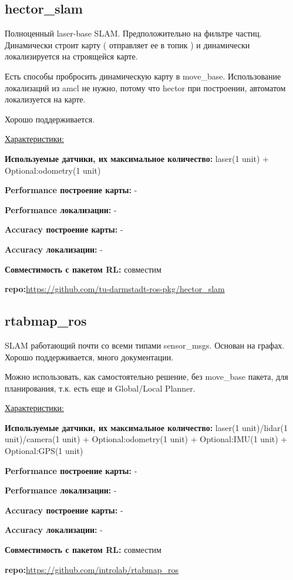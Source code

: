 \documentclass[a4paper, 14pt]{extreport}
\begin{document}
\subsection{hector\_slam}
\par Полноценный laser-base SLAM. Предположительно на фильтре частиц. Динамически строит карту ( отправляет ее в топик ) и динамически локализируется на строящейся карте.
\par\noindent Есть способы пробросить динамическую карту в move\_base. Использование локализаций из amcl не нужно, потому что hector при построении, автоматом локализуется на карте.
\par\noindent Хорошо поддерживается.
\vspace{2mm}
\par\noindent \underline{Характеристики:}
\par\textbf{Используемые датчики, их максимальное количество:} laser(1 unit) + Optional:odometry(1 unit)
\par\textbf{Performance построение карты:} -
\par\textbf{Performance локализации:} -
\par\textbf{Accuracy построение карты:} -
\par\textbf{Accuracy локализации:} -
\par\textbf{Совместимость с пакетом RL:} совместим
\par\textbf{repo:}\url{https://github.com/tu-darmstadt-ros-pkg/hector_slam}
\subsection{rtabmap\_ros}
\par SLAM работающий почти со всеми типами sensor\_msgs. Основан на графах. Хорошо поддерживается, много документации.
\par\noindent Можно использовать, как самостоятельно решение, без move\_base пакета, для планирования, т.к. есть еще и Global/Local Planner.
\vspace{2mm}
\par\noindent \underline{Характеристики:}
\par\textbf{Используемые датчики, их максимальное количество:} laser(1 unit)/lidar(1 unit)/camera(1 unit) + Optional:odometry(1 unit) + Optional:IMU(1 unit) + Optional:GPS(1 unit)
\par\textbf{Performance построение карты:} -
\par\textbf{Performance локализации:} -
\par\textbf{Accuracy построение карты:} -
\par\textbf{Accuracy локализации:} -
\par\textbf{Совместимость с пакетом RL:} совместим
\par\textbf{repo:}\url{https://github.com/introlab/rtabmap_ros}
\end{document}
